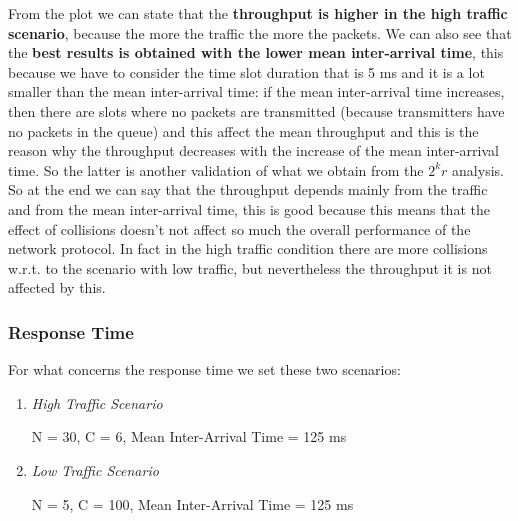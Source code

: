 \noindent From the plot we can state that the \textbf{throughput is higher in the high traffic scenario}, because the more the traffic the more the packets. We can also see that the \textbf{best results is obtained with the lower mean inter-arrival time}, this because we have to consider the time slot duration that is 5 ms and it is a lot smaller than the mean inter-arrival time: if the mean inter-arrival time increases, then there are slots where no packets are transmitted (because transmitters have no packets in the queue) and this affect the mean throughput and this is the reason why the throughput decreases with the increase of the mean inter-arrival time. So the latter is another validation of what we obtain from the $2^kr$ analysis. So at the end we can say that the throughput depends mainly from the traffic and from the mean inter-arrival time, this is good because this means that the effect of collisions doesn't not affect so much the overall performance of the network protocol. In fact in the high traffic condition there are more collisions w.r.t. to the scenario with low traffic, but nevertheless the throughput it is not affected by this.




\subsubsection{Response Time}
For what concerns the response time we set these two scenarios:
\begin{enumerate}
	\item \textit{High Traffic Scenario}
	
	N = 30, C = 6, Mean Inter-Arrival Time = 125 ms
	\item \textit{Low Traffic Scenario}
	
	N = 5, C = 100, Mean Inter-Arrival Time = 125 ms
\end{enumerate}

